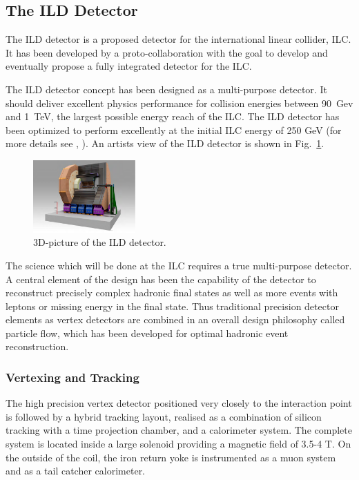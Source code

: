 \subsection{The ILD Detector}
The ILD detector is a proposed detector for the international linear collider, ILC. It has been developed by a proto-collaboration with the goal to develop and eventually propose a fully integrated detector for the ILC. 

The ILD detector concept has been designed as a multi-purpose detector. It should deliver excellent physics performance for collision energies between 90~Gev and 1~TeV, the largest possible energy reach of the ILC. The ILD detector has been optimized to perform excellently at the initial ILC energy of 250 GeV (for more details see \cite{ild:bib:ILDloi}, \cite{ild:bib:ILDDBD}). An artists view of the ILD detector is shown in Fig.~\ref{fig:ild_3d}. 
\begin{figure}
    \centering
    \includegraphics[width=0.35\textwidth]{../figures/ILD.pdf}
    \caption{3D-picture of the ILD detector.}
    \label{fig:ild_3d}
\end{figure}

The science which will be done at the ILC requires a true multi-purpose detector. A central element of the design has been the capability of the detector to reconstruct precisely complex hadronic final states as well as more events with leptons or missing energy in the final state. Thus traditional precision detector elements as vertex detectors are combined in an overall design philosophy called particle flow, which has been developed for optimal hadronic event reconstruction.

\subsubsection{Vertexing and Tracking}
\label{subsubsec:ILDtracker}
The high precision vertex detector positioned very closely to the interaction point is followed by a hybrid tracking layout, realised as a combination of silicon tracking with a time projection chamber, and a calorimeter system. The complete system is located inside a large solenoid providing a magnetic field of 3.5-4 T. On the outside of the coil, the iron return yoke is instrumented as a muon system and as a tail catcher calorimeter. 

